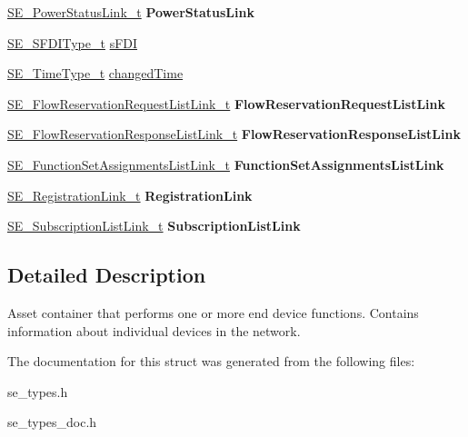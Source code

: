 \begin{DoxyCompactItemize}
\item 
\hyperlink{structSE__PowerStatusLink__t}{S\+E\+\_\+\+Power\+Status\+Link\+\_\+t} {\bfseries Power\+Status\+Link}
\item 
\hyperlink{group__SFDIType_ga08ad209b3cfce51cbdc450d1d35a1045}{S\+E\+\_\+\+S\+F\+D\+I\+Type\+\_\+t} \hyperlink{group__EndDevice_ga710ce8285a63cf5f3b269ed0f2d92511}{s\+F\+DI}
\item 
\hyperlink{group__TimeType_ga6fba87a5b57829b4ff3f0e7638156682}{S\+E\+\_\+\+Time\+Type\+\_\+t} \hyperlink{group__EndDevice_ga909dabe84c9c37177ec7a63776c0170f}{changed\+Time}
\item 
\hyperlink{structSE__FlowReservationRequestListLink__t}{S\+E\+\_\+\+Flow\+Reservation\+Request\+List\+Link\+\_\+t} {\bfseries Flow\+Reservation\+Request\+List\+Link}
\item 
\hyperlink{structSE__FlowReservationResponseListLink__t}{S\+E\+\_\+\+Flow\+Reservation\+Response\+List\+Link\+\_\+t} {\bfseries Flow\+Reservation\+Response\+List\+Link}
\item 
\hyperlink{structSE__FunctionSetAssignmentsListLink__t}{S\+E\+\_\+\+Function\+Set\+Assignments\+List\+Link\+\_\+t} {\bfseries Function\+Set\+Assignments\+List\+Link}
\item 
\hyperlink{structSE__RegistrationLink__t}{S\+E\+\_\+\+Registration\+Link\+\_\+t} {\bfseries Registration\+Link}
\item 
\hyperlink{structSE__SubscriptionListLink__t}{S\+E\+\_\+\+Subscription\+List\+Link\+\_\+t} {\bfseries Subscription\+List\+Link}
\end{DoxyCompactItemize}


\subsection{Detailed Description}
Asset container that performs one or more end device functions. Contains information about individual devices in the network. 

The documentation for this struct was generated from the following files\+:\begin{DoxyCompactItemize}
\item 
se\+\_\+types.\+h\item 
se\+\_\+types\+\_\+doc.\+h\end{DoxyCompactItemize}
